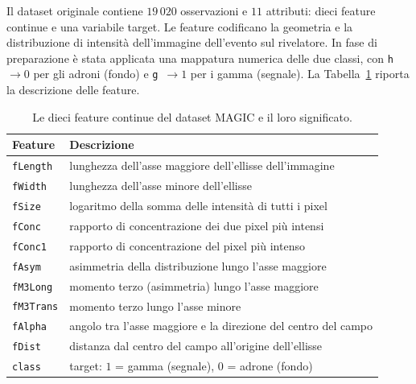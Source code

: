 \documentclass[12pt,a4paper]{article}
\begin{document}
Il dataset originale contiene $19\,020$ osservazioni e $11$ attributi: dieci feature continue e una variabile target. Le feature codificano la geometria e la distribuzione di intensità dell'immagine dell'evento sul rivelatore. In fase di preparazione è stata applicata una mappatura numerica delle due classi, con \texttt{h}~$\rightarrow 0$ per gli adroni (fondo) e \texttt{g}~$\rightarrow 1$ per i gamma (segnale). La Tabella~\ref{tab:feature} riporta la descrizione delle feature.

\begin{table}[H]\centering\small
	\caption{Le dieci feature continue del dataset MAGIC e il loro significato.}\label{tab:feature}
	\begin{tabular}{ll}
		\toprule
		\textbf{Feature}  & \textbf{Descrizione}                                           \\
		\midrule
		\texttt{fLength}  & lunghezza dell'asse maggiore dell'ellisse dell'immagine        \\
		\texttt{fWidth}   & lunghezza dell'asse minore dell'ellisse                        \\
		\texttt{fSize}    & logaritmo della somma delle intensità di tutti i pixel         \\
		\texttt{fConc}    & rapporto di concentrazione dei due pixel più intensi           \\
		\texttt{fConc1}   & rapporto di concentrazione del pixel più intenso               \\
		\texttt{fAsym}    & asimmetria della distribuzione lungo l'asse maggiore           \\
		\texttt{fM3Long}  & momento terzo (asimmetria) lungo l'asse maggiore               \\
		\texttt{fM3Trans} & momento terzo lungo l'asse minore                              \\
		\texttt{fAlpha}   & angolo tra l'asse maggiore e la direzione del centro del campo \\
		\texttt{fDist}    & distanza dal centro del campo all'origine dell'ellisse         \\
		\midrule
		\texttt{class}    & target: $1$ = gamma (segnale), $0$ = adrone (fondo)            \\
		\bottomrule
	\end{tabular}
\end{table}

\end{document}

